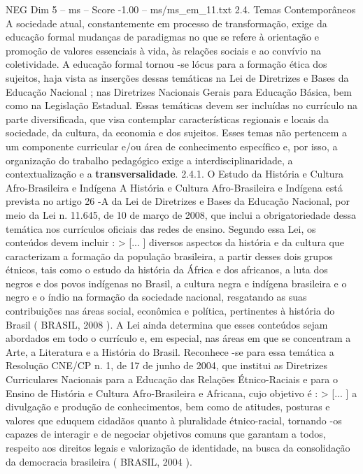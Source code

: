 \begin{textsample}{NEG Dim 5 – ms – Score -1.00 – ms/ms\_em\_11.txt}  \label{ex:f5_neg_077}
2.4.
Temas Contemporâneos A sociedade atual, constantemente em processo de transformação, exige da educação formal mudanças de paradigmas no que se refere à orientação e promoção de valores essenciais à vida, às relações sociais e ao convívio na coletividade.
A educação formal tornou -se lócus para a formação ética dos sujeitos, haja vista as inserções dessas temáticas na Lei de Diretrizes e Bases da Educação Nacional ; nas Diretrizes Nacionais Gerais para Educação Básica, bem como na Legislação Estadual.
Essas temáticas devem ser incluídas no currículo na parte diversificada, que visa contemplar características regionais e locais da sociedade, da cultura, da economia e dos sujeitos.
Esses temas não pertencem a um componente curricular e/ou área de conhecimento específico e, por isso, a organização do trabalho pedagógico exige a interdisciplinaridade, a contextualização e a \textbf{transversalidade}. 2.4.1.
O Estudo da História e Cultura Afro-Brasileira e Indígena A História e Cultura Afro-Brasileira e Indígena está prevista no artigo 26 -A da Lei de Diretrizes e Bases da Educação Nacional, por meio da Lei n. 11.645, de 10 de março de 2008, que inclui a obrigatoriedade dessa temática nos currículos oficiais das redes de ensino.
Segundo essa Lei, os conteúdos devem incluir : > [... ] diversos aspectos da história e da cultura que caracterizam a formação da população brasileira, a partir desses dois grupos étnicos, tais como o estudo da história da África e dos africanos, a luta dos negros e dos povos indígenas no Brasil, a cultura negra e indígena brasileira e o negro e o índio na formação da sociedade nacional, resgatando as suas contribuições nas áreas social, econômica e política, pertinentes à história do Brasil ( BRASIL, 2008 ).
A Lei ainda determina que esses conteúdos sejam abordados em todo o currículo e, em especial, nas áreas em que se concentram a Arte, a Literatura e a História do Brasil.
Reconhece -se para essa temática a Resolução CNE/CP n. 1, de 17 de junho de 2004, que institui as Diretrizes Curriculares Nacionais para a Educação das Relações Étnico-Raciais e para o Ensino de História e Cultura Afro-Brasileira e Africana, cujo objetivo é : > [... ] a divulgação e produção de conhecimentos, bem como de atitudes, posturas e valores que eduquem cidadãos quanto à pluralidade étnico-racial, tornando -os capazes de interagir e de negociar objetivos comuns que garantam a todos, respeito aos direitos legais e valorização de identidade, na busca da consolidação da democracia brasileira ( BRASIL, 2004 ).

\end{textsample}
